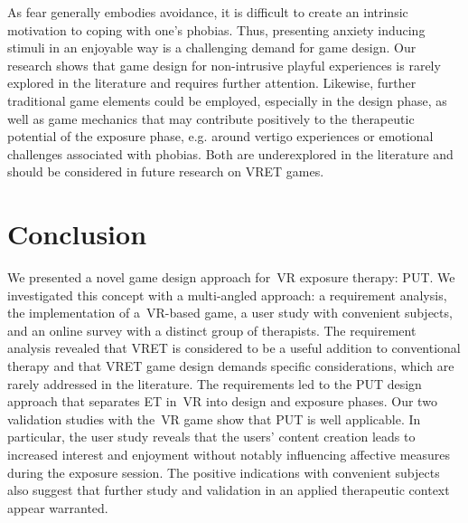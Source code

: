As fear generally embodies avoidance, it is difficult to create an intrinsic motivation to coping with one's phobias. Thus, presenting anxiety inducing stimuli in an enjoyable way is a challenging demand for game design.
Our research shows that game design for non-intrusive playful experiences is rarely explored in the literature and requires further attention. Likewise, further traditional game elements could be employed, especially in the design phase, as well as game mechanics that may contribute positively to the therapeutic potential of the exposure phase, e.g. around vertigo experiences or emotional challenges associated with phobias. Both are underexplored in the literature and should be considered in future research on \ac{VRET} games.


\section{Conclusion}
\label{sec:conclusion}
We presented a novel game design approach for~\ac{VR} exposure therapy: \acf{PUT}. We investigated this concept with a multi-angled approach: a requirement analysis, the implementation of a~\ac{VR}-based game, a user study with convenient subjects, and an online survey with a distinct group of therapists.
The requirement analysis revealed that \ac{VRET} is considered to be a useful addition to conventional therapy and that \ac{VRET} game design demands specific considerations, which are rarely addressed in the literature. The requirements led to the \ac{PUT} design approach that separates \ac{ET} %
in~\ac{VR} into design and exposure phases. Our two validation studies with the~\ac{VR} game show that \ac{PUT} is well applicable. In particular, the user study reveals that the users' content creation leads to increased interest and enjoyment without notably influencing affective measures during the exposure session. The positive indications with convenient subjects also suggest that further study and validation in an applied therapeutic context appear warranted.


